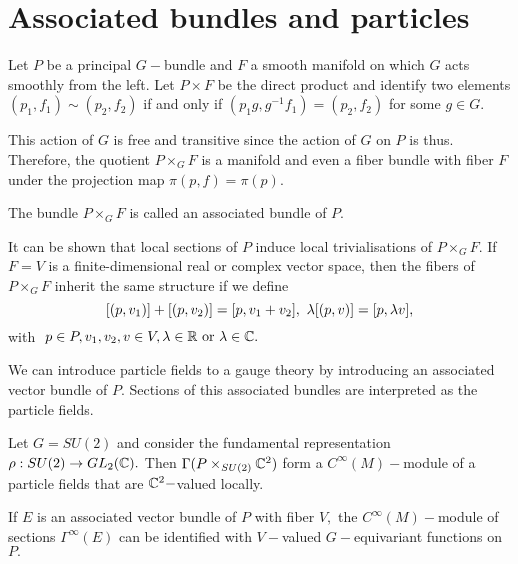 \section{Associated bundles and particles}

Let $P$ be a principal $G-$bundle and $F$ a smooth manifold on which $G$ acts smoothly from the left. Let $P \times F$
be the direct product and identify two elements $(p_{1}, f_{1}) \sim (p_{2}, f_{2})$ if and only if $(p_{1}g,
g^{-1}f_{1})= (p_{2},f_{2})$ for some $g \in G.$

This action of $G$ is free and transitive since the action of $G$ on $P$ is thus. Therefore, the quotient $P \times_{G}
F$ is a manifold and even a fiber bundle with fiber $F$ under the projection map $\pi(p,f)= \pi(p).$

\begin{defn}
 \label{JB:4.1}
 The bundle $P \times_{G} F$ is called an associated bundle of $P$.
\end{defn}

It can be shown that local sections of $P$ induce local trivialisations of $P \times_{G} F.$ If $F=V$ is a
finite-dimensional real or complex vector space, then the fibers of $P \times_{G} F$ inherit the same structure if we
define
$$
[(p,v_{1})]+[(p,v_{2})]=[p, v_{1}+v_{2}], \ \lam[(p,v)]=[p, \lam v],
$$
with $\ p\in P, v_{1},v_{2}, v \in V, \lambda \in \mathbb R \text{ or } \lambda \in \mathbb C.$

We can introduce particle fields to a gauge theory by introducing an associated vector bundle of $P.$ Sections of this
associated bundles are interpreted as the particle fields.

\begin{exmp}
 Let $G=SU(2)$ and consider the fundamental representation $\rho: SU(2) \to GL_{2}(\mathbb C).$ Then $\Gamma(P \times _{SU(2)}
\mathbb C^{2})$ form a $C^{\infty}(M)-$module of a particle fields that are $\mathbb C^{2}-$valued locally.
\end{exmp}

If $E$ is an associated vector bundle of $P$ with fiber $V,$ the $C^{\infty}(M)-$module of sections
$\Gamma^{\infty}(E)$ can be identified with $V-$valued $G-$equivariant functions on $P.$


